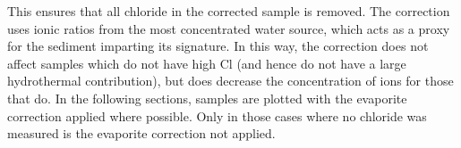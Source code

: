 This ensures that all chloride in the corrected sample is removed. The correction uses ionic ratios from the most concentrated water source, which acts as a proxy for the sediment imparting its signature.  In this way, the correction does not affect samples which do not have high Cl (and hence do not have a large hydrothermal contribution), but does decrease the concentration of ions for those that do. In the following sections, samples are plotted with the evaporite correction applied where possible. Only in those cases where no chloride was measured is the evaporite correction not applied.





